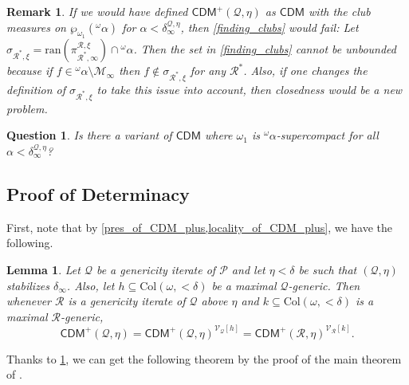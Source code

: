 \documentclass{amsart}
\newtheorem{lem}[dfn]{Lemma}
\newtheorem{rem}[dfn]{Remark}
\newtheorem{ques}[dfn]{Question}
\renewcommand{\subset}{\subseteq}
\newcommand{\power}{\wp}
\begin{document}
\begin{rem}\label{rem_on_def_of_CDM_plus}
If we would have defined $\mathsf{CDM}^+(\mathcal{Q}, \eta)$ as $\mathsf{CDM}$ with the club measures on $\power_{\omega_1}({}^{\omega}\alpha)$ for $\alpha<\delta^{\mathcal{Q}, \eta}_{\infty}$, then \cref{finding_clubs} would fail: Let $\sigma_{\mathcal{R}^*, \xi} = \mathrm{ran}(\pi^{\mathcal{R}, \xi}_{\mathcal{R}^*, \infty})\cap{}^{\omega}\alpha$.
Then the set in \cref{finding_clubs} cannot be unbounded because if $f\in{}^{\omega}\alpha\setminus\mathcal{M}_{\infty}$ then $f\notin\sigma_{\mathcal{R}^*, \xi}$ for any $\mathcal{R}^*$.
Also, if one changes the definition of $\sigma_{\mathcal{R}^*, \xi}$ to take this issue into account, then closedness would be a new problem.
\end{rem}

\begin{ques}
    Is there a variant of $\mathsf{CDM}$ where $\omega_1$ is ${}^{\omega}\alpha$-supercompact for all $\alpha<\delta^{\mathcal{Q}, \eta}_{\infty}$?
\end{ques}

\subsection{Proof of Determinacy}

First, note that by \cref{pres_of_CDM_plus,locality_of_CDM_plus}, we have the following.

\begin{lem}\label{pres_of_local_CDM_plus}
Let $\mathcal{Q}$ be a genericity iterate of $\mathcal{P}$ and let $\eta<\delta$ be such that $(\mathcal{Q}, \eta)$ stabilizes $\delta_{\infty}$.
Also, let $h\subset\mathrm{Col}(\omega, {<}\delta)$ be a maximal $\mathcal{Q}$-generic.
Then whenever $\mathcal{R}$ is a genericity iterate of $\mathcal{Q}$ above $\eta$ and $k\subset\mathrm{Col}(\omega, {<}\delta)$ is a maximal $\mathcal{R}$-generic,
\[
\mathsf{CDM}^{+}(\mathcal{Q}, \eta)=\mathsf{CDM}^{+}(\mathcal{Q}, \eta)^{\mathcal{V}_{\mathcal{Q}}[h]}=\mathsf{CDM}^+(\mathcal{R}, \eta)^{\mathcal{V}_{\mathcal{R}}[k]}.
\]
\end{lem}

Thanks to \cref{pres_of_local_CDM_plus}, we can get the following theorem by the proof of the main theorem of \cite{CoveringChang}.
\end{document}
